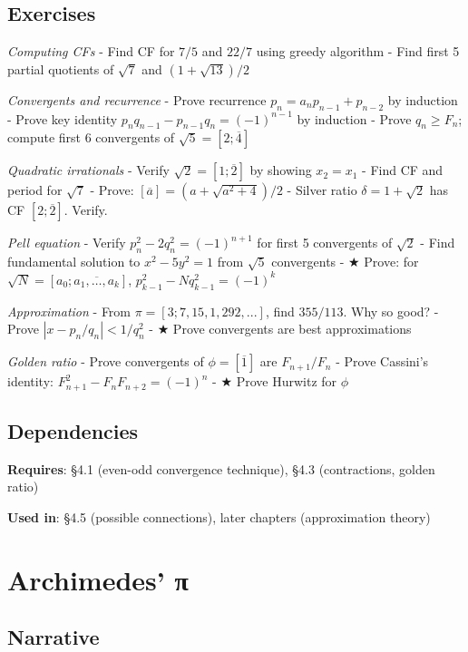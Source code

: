 \documentclass[
  10pt,
  letterpaper,
]{scrbook}
\begin{document}
\subsection{Exercises}\label{exercises-18}

\emph{Computing CFs} - Find CF for \(7/5\) and \(22/7\) using greedy
algorithm - Find first 5 partial quotients of \(\sqrt{7}\) and
\((1 + \sqrt{13})/2\)

\emph{Convergents and recurrence} - Prove recurrence
\(p_n = a_n p_{n-1} + p_{n-2}\) by induction - Prove key identity
\(p_n q_{n-1} - p_{n-1} q_n = (-1)^{n-1}\) by induction - Prove
\(q_n \geq F_n\); compute first 6 convergents of
\(\sqrt{5} = [2; \overline{4}]\)

\emph{Quadratic irrationals} - Verify \(\sqrt{2} = [1; \overline{2}]\)
by showing \(x_2 = x_1\) - Find CF and period for \(\sqrt{7}\) - Prove:
\([\overline{a}] = (a + \sqrt{a^2 + 4})/2\) - Silver ratio
\(\delta = 1 + \sqrt{2}\) has CF \([2; \overline{2}]\). Verify.

\emph{Pell equation} - Verify \(p_n^2 - 2q_n^2 = (-1)^{n+1}\) for first
5 convergents of \(\sqrt{2}\) - Find fundamental solution to
\(x^2 - 5y^2 = 1\) from \(\sqrt{5}\) convergents - ★ Prove: for
\(\sqrt{N} = [a_0; \overline{a_1, \ldots, a_k}]\),
\(p_{k-1}^2 - Nq_{k-1}^2 = (-1)^k\)

\emph{Approximation} - From \(\pi = [3; 7, 15, 1, 292, ...]\), find
\(355/113\). Why so good? - Prove \(|x - p_n/q_n| < 1/q_n^2\) - ★ Prove
convergents are best approximations

\emph{Golden ratio} - Prove convergents of \(\phi = [\overline{1}]\) are
\(F_{n+1}/F_n\) - Prove Cassini's identity:
\(F_{n+1}^2 - F_n F_{n+2} = (-1)^n\) - ★ Prove Hurwitz for \(\phi\)

\subsection{Dependencies}\label{dependencies-18}

\textbf{Requires}: §4.1 (even-odd convergence technique), §4.3
(contractions, golden ratio)

\textbf{Used in}: §4.5 (possible connections), later chapters
(approximation theory)

\section{Archimedes' π}\label{archimedes-ux3c0}

\subsection{Narrative}\label{narrative-19}
\end{document}
